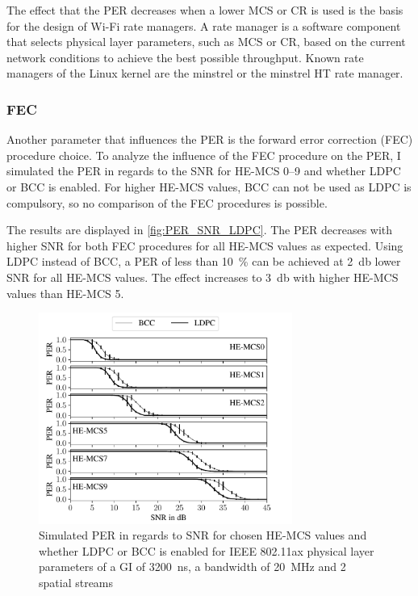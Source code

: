The effect that the \ac{PER} decreases when a lower \ac{MCS} or \ac{CR} is used is the basis for the design of Wi-Fi rate managers.
A rate manager is a software component that selects physical layer parameters, such as \ac{MCS} or \ac{CR}, based on the current network conditions to
achieve the best possible throughput. Known rate managers of the Linux kernel are the minstrel or the minstrel HT rate manager.

\subsubsection*{\acf{FEC}}
Another parameter that influences the \ac{PER} is the forward error correction (FEC) procedure choice. To
analyze the influence of the FEC procedure on the \ac{PER}, I simulated the \ac{PER} in regards to the \ac{SNR} for HE-MCS
\numrange{0}{9} and whether \ac{LDPC} or \ac{BCC} is enabled. For higher HE-MCS values, \ac{BCC} can not be used as \ac{LDPC} is compulsory, so no comparison of the \ac{FEC} procedures is possible.

The results are displayed in \autoref{fig:PER_SNR_LDPC}. The \ac{PER} decreases with higher \ac{SNR} for both \ac{FEC} procedures for all HE-MCS values as
expected. Using \ac{LDPC} instead of \ac{BCC}, a \ac{PER} of less than \SI{10}{\percent} can be achieved at \SI{2}{\decibel} lower \ac{SNR}
for all HE-MCS values. The effect increases to \SI{3}{\decibel} with higher HE-MCS values than HE-MCS \num{5}.
\begin{figure}[H]%
   \centering
   \includegraphics[width=0.74\textwidth]{figures/LDPC_PER_to_SNR.pdf}
   \caption{Simulated \ac{PER} in regards to \ac{SNR} for chosen HE-\ac{MCS} values and whether \ac{LDPC} or \ac{BCC} is enabled for IEEE 802.11ax physical layer parameters of a \ac{GI} of \SI{3200}{\nano\second}, a bandwidth of \SI{20}{\mega\hertz} and 2 spatial streams}%
   \label{fig:PER_SNR_LDPC}%
\end{figure}

